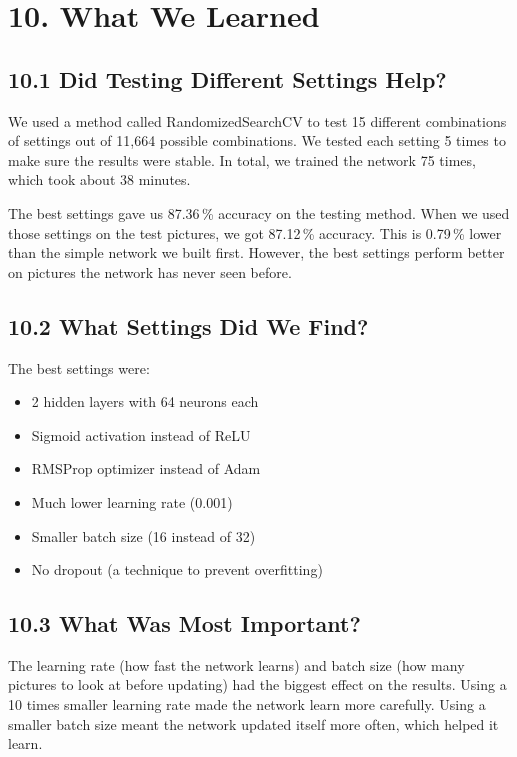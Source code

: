 \documentclass[11pt]{article}
\begin{document}
\section*{10. What We Learned}

\subsection*{10.1 Did Testing Different Settings Help?}

We used a method called RandomizedSearchCV to test 15 different combinations of settings out of 11,664 possible combinations. We tested each setting 5 times to make sure the results were stable. In total, we trained the network 75 times, which took about 38 minutes.

The best settings gave us 87.36\,\% accuracy on the testing method. When we used those settings on the test pictures, we got 87.12\,\% accuracy. This is 0.79\,\% lower than the simple network we built first. However, the best settings perform better on pictures the network has never seen before.

\subsection*{10.2 What Settings Did We Find?}

The best settings were:
\begin{itemize}[leftmargin=*]
\item 2 hidden layers with 64 neurons each
\item Sigmoid activation instead of ReLU
\item RMSProp optimizer instead of Adam
\item Much lower learning rate (0.001)
\item Smaller batch size (16 instead of 32)
\item No dropout (a technique to prevent overfitting)
\end{itemize}

\subsection*{10.3 What Was Most Important?}

The learning rate (how fast the network learns) and batch size (how many pictures to look at before updating) had the biggest effect on the results. Using a 10 times smaller learning rate made the network learn more carefully. Using a smaller batch size meant the network updated itself more often, which helped it learn.
\end{document}
